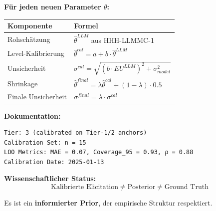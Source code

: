 \begin{tcolorbox}[colback=green!5!white, colframe=green!75!black,
    title=\textbf{Operativer Prior nach Kalibrierung}]

\textbf{Für jeden neuen Parameter $\theta$:}

\begin{center}
\renewcommand{\arraystretch}{1.3}
\begin{tabular}{@{}ll@{}}
\toprule
\textbf{Komponente} & \textbf{Formel} \\
\midrule
Rohschätzung & $\hat{\theta}^{LLM}$ aus HHH-LLMMC-1 \\
Level-Kalibrierung & $\hat{\theta}^{cal} = a + b \cdot \hat{\theta}^{LLM}$ \\
Unsicherheit & $\sigma^{cal} = \sqrt{(b \cdot EU^{LLM})^2 + \sigma_{model}^2}$ \\
Shrinkage & $\hat{\theta}^{final} = \lambda \hat{\theta}^{cal} + (1-\lambda) \cdot 0.5$ \\
Finale Unsicherheit & $\sigma^{final} = \lambda \cdot \sigma^{cal}$ \\
\bottomrule
\end{tabular}
\end{center}

\textbf{Dokumentation:}
\begin{verbatim}
Tier: 3 (calibrated on Tier-1/2 anchors)
Calibration Set: n = 15
LOO Metrics: MAE = 0.07, Coverage_95 = 0.93, ρ = 0.88
Calibration Date: 2025-01-13
\end{verbatim}

\textbf{Wissenschaftlicher Status:}
\begin{equation*}
\boxed{\text{Kalibrierte Elicitation} \neq \text{Posterior} \neq \text{Ground Truth}}
\end{equation*}

Es ist ein \textbf{informierter Prior}, der empirische Struktur respektiert.

\end{tcolorbox}

